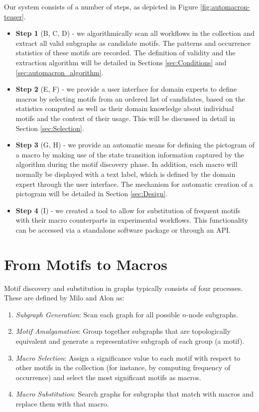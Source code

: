 Our system consists of a number of steps, as depicted in Figure \ref{fig:automacron-teaser}.
\begin{itemize}
\item \textbf{Step 1} (B, C, D) - we algorithmically scan all workflows in the collection and extract all valid subgraphs as candidate motifs.
The patterns and occurrence statistics of these motifs are recorded.
The definition of validity and the extraction algorithm will be detailed in Sections \ref{sec:Conditions} and \ref{sec:automacron_algorithm}.
\item \textbf{Step 2} (E, F) - we provide a user interface for domain experts to define macros by selecting motifs from an ordered list of candidates, based on the statistics computed as well as their domain knowledge about individual motifs and the context of their usage.
This will be discussed in detail in Section \ref{sec:Selection}.
\item \textbf{Step 3} (G, H) - we provide an automatic means for defining the pictogram of a macro by making use of the state transition information captured by the algorithm during the motif discovery phase.
In addition, each macro will normally be displayed with a text label, which is defined by the domain expert through the user interface.
The mechanism for automatic creation of a pictogram will be detailed in Section \ref{sec:Design}.
\item \textbf{Step 4} (I) - we created a tool to allow for substitution of frequent motifs with their macro counterparts in experimental workflows.
This functionality can be accessed via a standalone software package or through an API.
\end{itemize}

\section{From Motifs to Macros}
\label{sec:Motif}

Motif discovery and substitution in graphs typically consists of four processes. These are defined by Milo \etal \cite{Milo:2002} and Alon \cite{Alon:2007} as:

\vspace{-2mm}
\begin{enumerate}[itemsep=-1mm]
\item \emph{Subgraph Generation}: Scan each graph for all possible $n$-node subgraphs.
\item \emph{Motif Amalgamation}: Group together subgraphs that are topologically equivalent and generate a representative subgraph of each group (a motif).
\item \emph{Macro Selection}: Assign a significance value to each motif with respect to other motifs in the collection (for instance, by computing frequency of occurrence) and select the most significant motifs as macros.
\item \emph{Macro Substitution}: Search graphs for subgraphs that match with macros and replace them with that macro.
\end{enumerate}

